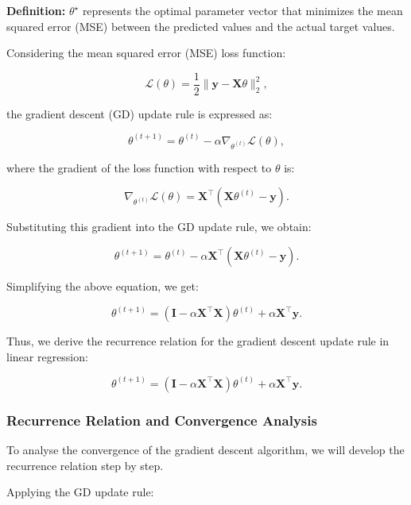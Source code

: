 \textbf{Definition:} \(\theta^\star\) represents the optimal parameter vector that minimizes the mean squared error (MSE) between the predicted values and the actual target values.

Considering the mean squared error (MSE) loss function:

\[
    \mathcal{L}(\theta) = \frac{1}{2} \|\boldsymbol{y} - \boldsymbol{X} \theta\|_2^2,
\]

the gradient descent (GD) update rule is expressed as:

\[
    \theta^{(t+1)} = \theta^{(t)} - \alpha \nabla_{\theta^{(t)}} \mathcal{L}(\theta),
\]

where the gradient of the loss function with respect to \(\theta\) is:

\[
    \nabla_{\theta^{(t)}} \mathcal{L}(\theta) = \boldsymbol{X}^\top (\boldsymbol{X} \theta^{(t)} - \boldsymbol{y}).
\]

Substituting this gradient into the GD update rule, we obtain:

\[
    \theta^{(t+1)} = \theta^{(t)} - \alpha \boldsymbol{X}^\top (\boldsymbol{X} \theta^{(t)} - \boldsymbol{y}).
\]

Simplifying the above equation, we get:

\[
    \theta^{(t+1)} = (\mathbf{I} - \alpha \boldsymbol{X}^\top \boldsymbol{X}) \theta^{(t)} + \alpha \boldsymbol{X}^\top \boldsymbol{y}.
\]

Thus, we derive the recurrence relation for the gradient descent update rule in linear regression:

\[
    \theta^{(t+1)} = (\mathbf{I} - \alpha \boldsymbol{X}^\top \boldsymbol{X}) \theta^{(t)} + \alpha \boldsymbol{X}^\top \boldsymbol{y}.
\]

\subsubsection{Recurrence Relation and Convergence Analysis}
\raggedright
To analyse the convergence of the gradient descent algorithm, we will develop the recurrence relation step by step.




Applying the GD update rule:

